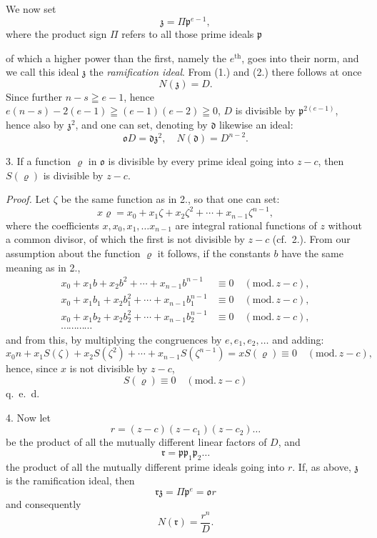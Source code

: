 \documentclass{article}
\begin{document}
We now set
\[ \mathfrak{z} = \Pi\mathfrak{p}^{e-1}, \tag{2.} \]
where the product sign $\Pi$ refers to all those prime ideals $\mathfrak{p}$

of which a higher power than the first, namely the $e^{\text{th}}$, goes into their norm, and we call this ideal $\mathfrak{z}$ the \emph{ramification ideal}. From (1.) and (2.) there follows at once
\[ N(\mathfrak{z}) = D. \tag{3.} \]
Since further $n-s \geqq e-1$, hence $e(n-s) - 2(e-1) \geqq (e-1)(e-2) \geqq 0$, $D$ is divisible by $\mathfrak{p}^{2(e-1)}$, hence also by $\mathfrak{z}^{2}$, and one can set, denoting by $\mathfrak{d}$ likewise an ideal:
\[ \mathfrak{o}D = \mathfrak{d}\mathfrak{z}^{2}, \quad N(\mathfrak{d}) = D^{n-2}. \tag{4.} \]

3. If a function $\varrho$ in $\mathfrak{o}$ is divisible by every prime ideal going into $z-c$, then $S(\varrho)$ is divisible by $z-c$.

\emph{Proof.} Let $\zeta$ be the same function as in 2., so that one can set:
\[ x\varrho = x_{0} + x_{1}\zeta + x_{2}\zeta^{2} + \cdots + x_{n-1}\zeta^{n-1}, \]
where the coefficients $x, x_{0}, x_{1}, \ldots x_{n-1}$ are integral rational functions of $z$ without a common divisor, of which the first is not divisible by $z-c$ (cf.\ 2.). From our assumption about the function $\varrho$ it follows, if the constants $b$ have the same meaning as in 2.,
\[ \begin{aligned} x_{0} + x_{1}b + x_{2}b^{2} + \cdots + x_{n-1}b^{n-1} &\equiv 0 \quad (\text{mod.}\,z-c), \\ x_{0} + x_{1}b_{1} + x_{2}b_{1}^{2} + \cdots + x_{n-1}b_{1}^{n-1} &\equiv 0 \quad (\text{mod.}\,z-c), \\ x_{0} + x_{1}b_{2} + x_{2}b_{2}^{2} + \cdots + x_{n-1}b_{2}^{n-1} &\equiv 0 \quad (\text{mod.}\,z-c), \\ \cdots\cdots\cdots\cdots& \end{aligned} \]
and from this, by multiplying the congruences by $e, e_{1}, e_{2}, \ldots$ and adding:
\[ x_{0}n + x_{1}S(\zeta) + x_{2}S(\zeta^{2}) + \cdots + x_{n-1}S(\zeta^{n-1}) = xS(\varrho) \equiv 0 \quad (\text{mod.}\,z-c), \]
hence, since $x$ is not divisible by $z-c$,
\[ S(\varrho) \equiv 0 \quad (\text{mod.}\,z-c) \]
q.\ e.\ d.

4. Now let
\[ r = (z-c)(z-c_{1})(z-c_{2})\ldots \]
be the product of all the mutually different linear factors of $D$, and
\[ \mathfrak{r} = \mathfrak{p}\mathfrak{p}_{1}\mathfrak{p}_{2}\ldots \]
the product of all the mutually different prime ideals going into $r$. If, as above, $\mathfrak{z}$ is the ramification ideal, then
\[ \mathfrak{r}\mathfrak{z} = \Pi\mathfrak{p}^{e} = \mathfrak{o}r \tag{5.} \]
and consequently
\[ N(\mathfrak{r}) = \frac{r^{n}}{D}. \]
\end{document}
